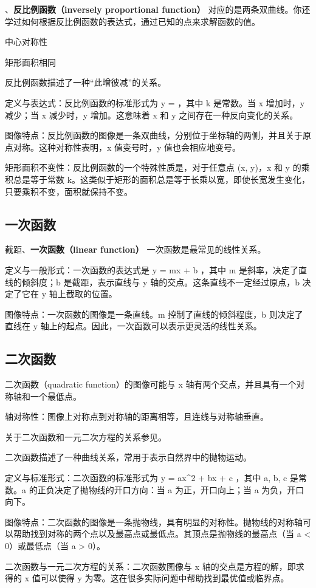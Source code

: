 、\textbf{反比例函数（inversely proportional function）}
对应的是两条双曲线。你还学过如何根据反比例函数的表达式，通过已知的点来求解函数的值。

中心对称性

矩形面积相同

反比例函数描述了一种“此增彼减”的关系。

定义与表达式：反比例函数的标准形式为  y =  ，其中 k 是常数。当 x 增加时，y 减少；当 x 减少时，y 增加。这意味着 x 和 y 之间存在一种反向变化的关系。

图像特点：反比例函数的图像是一条双曲线，分别位于坐标轴的两侧，并且关于原点对称。这种对称性表明，x 值变号时，y 值也会相应地变号。

矩形面积不变性：反比例函数的一个特殊性质是，对于任意点 (x, y)，x 和 y 的乘积总是等于常数 k。这类似于矩形的面积总是等于长乘以宽，即使长宽发生变化，只要乘积不变，面积就保持不变。

\subsection{一次函数}

截距、\textbf{一次函数（linear function）}
一次函数是最常见的线性关系。

定义与一般形式：一次函数的表达式是  y = mx + b ，其中 m 是斜率，决定了直线的倾斜度；b 是截距，表示直线与 y 轴的交点。这条直线不一定经过原点，b 决定了它在 y 轴上截取的位置。

图像特点：一次函数的图像是一条直线。m 控制了直线的倾斜程度，b 则决定了直线在 y 轴上的起点。因此，一次函数可以表示更灵活的线性关系。

\subsection{二次函数}

二次函数（quadratic function）的图像可能与  x  轴有两个交点，并且具有一个对称轴和一个最低点。

轴对称性：图像上对称点到对称轴的距离相等，且连线与对称轴垂直。

关于二次函数和一元二次方程的关系参见。

二次函数描述了一种曲线关系，常用于表示自然界中的抛物运动。

定义与标准形式：二次函数的标准形式为  y = ax^2 + bx + c ，其中 a, b, c 是常数。a 的正负决定了抛物线的开口方向：当 a 为正，开口向上；当 a 为负，开口向下。

图像特点：二次函数的图像是一条抛物线，具有明显的对称性。抛物线的对称轴可以帮助找到对称的两个点以及最高点或最低点。其顶点是抛物线的最高点（当 a < 0）或最低点（当 a > 0）。

二次函数与一元二次方程的关系：二次函数图像与 x 轴的交点是方程的解，即求得的 x 值可以使得 y 为零。这在很多实际问题中帮助找到最优值或临界点。
